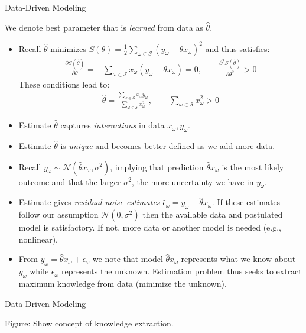 \documentclass[9pt]{beamer}
\begin{document}
%
\begin{frame}{Data-Driven Modeling}

We denote best parameter that is {\em learned} from data as $\hat{\theta}$. 
\begin{itemize}
\item Recall $\hat{\theta}$ minimizes $S(\theta)=\frac{1}{2}\sum_{\omega \in \mathcal{S}} (y_\omega-\theta x_\omega)^2$ and thus satisfies:
\begin{align*}
\frac{\partial S(\hat{\theta})}{\partial \theta}=-\sum_{\omega \in \mathcal{S}}x_\omega (y_\omega-\theta x_\omega)=0,\qquad  \frac{\partial^2 S(\hat{\theta})}{\partial \theta^2}>0
\end{align*}
These conditions lead to:
\begin{align*}
\hat{\theta}=\frac{\sum_{\omega \in \mathcal{S}}x_\omega y_\omega}{\sum_{\omega \in \mathcal{S}}x_\omega^2},\qquad \sum_{\omega \in \mathcal{S}}x_\omega^2>0 
\end{align*}
\item Estimate $\hat{\theta}$ captures {\em interactions} in data $x_\omega,y_\omega$. 
\item Estimate $\hat{\theta}$ is {\em unique} and becomes better defined as we add more data. 
\item Recall $y_\omega \sim \mathcal{N}(\hat{\theta} x_\omega,\sigma^2)$, implying that prediction $\hat{\theta} x_\omega$ is the most likely outcome and that the larger $\sigma^2$, the more uncertainty we have in $y_\omega$. 
\item Estimate gives {\em residual noise estimates} $\hat{\epsilon}_\omega =y_\omega-\hat{\theta}x_\omega$. If these estimates follow our assumption $\mathcal{N}(0,\sigma^2)$ then the available data and postulated model is satisfactory. If not, more data or another model is needed (e.g., nonlinear). 

\item From $y_\omega=\hat{\theta}x_\omega+\epsilon_\omega$ we note that model $\hat{\theta}x_\omega$ represents what we know about $y_\omega$ while $\epsilon_\omega$ represents the unknown. Estimation problem thus seeks to extract maximum knowledge from data (minimize the unknown). 
\end{itemize}
\end{frame}

%
\begin{frame}{Data-Driven Modeling}

\begin{block}{}
Figure: Show concept of knowledge extraction. 
\end{block}

\end{frame}
\end{document}
